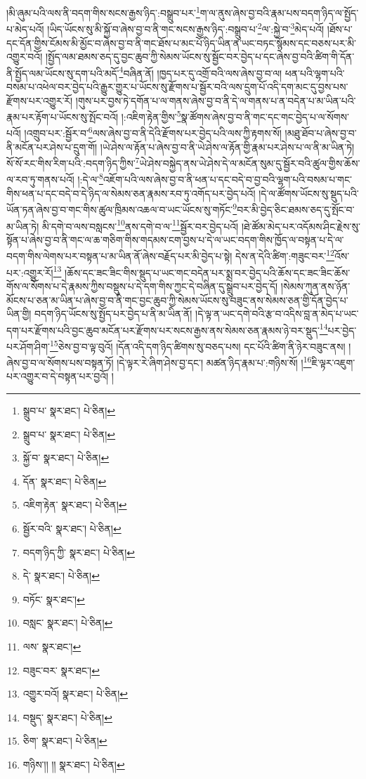 །མི་ཞུམ་པའི་ལས་ནི་བདག་གིས་སངས་རྒྱས་ཉིད་:བསྒྲུབ་པར་\footnote{སྒྲུབ་པ་  སྣར་ཐང་།  པེ་ཅིན། }ག་ལ་ནུས་ཞེས་བྱ་བའི་རྣམ་པས་བདག་ཉིད་ལ་སྤྱོད་པ་མེད་པའོ། །ཡིད་ཡོངས་སུ་མི་སྐྱོ་བ་ཞེས་བྱ་བ་ནི་གང་སངས་རྒྱས་ཉིད་:བསྒྲུབ་པ་\footnote{སྒྲུབ་པ་  སྣར་ཐང་།  པེ་ཅིན། }ལ་:སྐྱེ་བ་\footnote{སྐྱོ་བ་  སྣར་ཐང་།  པེ་ཅིན། }མེད་པའོ། །ཐོས་པ་དང་དོན་གྱིས་ངོམས་མི་མྱོང་བ་ཞེས་བྱ་བ་ནི་གང་ཐོས་པ་མང་པོ་ཉིད་ཡིན་ན་ཡང་བཏང་སྙོམས་དང་བཅས་པར་མི་འགྱུར་བའོ། །སྤྱོད་ལམ་ཐམས་ཅད་དུ་བྱང་ཆུབ་ཀྱི་སེམས་ཡོངས་སུ་སྦྱོང་བར་བྱེད་པ་དང་ཞེས་བྱ་བའི་ཚིག་གི་དོན་ནི་སྤྱོད་ལམ་ཡོངས་སུ་དག་པའི་མདོ་\footnote{དོན་  སྣར་ཐང་།  པེ་ཅིན། }བཞིན་ནོ། །ཁྱད་པར་དུ་འགྲོ་བའི་ལས་ཞེས་བྱ་བ་ལ། ཕན་པའི་ལྷག་པའི་བསམ་པ་འཕེལ་བར་བྱེད་པའི་རྒྱུར་གྱུར་པ་ཡོངས་སུ་རྫོགས་པ་སྦྱོར་བའི་ལས་དྲུག་པོ་འདི་དག་མང་དུ་བྱས་པས་རྫོགས་པར་འགྱུར་རོ། །གུས་པར་བྱས་ཏེ་དགོན་པ་ལ་གནས་ཞེས་བྱ་བ་ནི་དེ་ལ་གནས་པ་ན་བདེན་པ་མ་ཡིན་པའི་རྣམ་པར་རྟོག་པ་ཡོངས་སུ་སྤོང་བའོ། །:འཇིག་རྟེན་གྱིས་\footnote{འཇིག་རྟེན་  སྣར་ཐང་།  པེ་ཅིན། }སྣ་ཚོགས་ཞེས་བྱ་བ་ནི་གང་དང་གང་བྱེད་པ་ལ་སོགས་པའོ། །འགྲུབ་པར་:སྦྱོར་བ་\footnote{སྦྱོར་བའི་  སྣར་ཐང་།  པེ་ཅིན། }ལས་ཞེས་བྱ་བ་ནི་དེའི་རྫོགས་པར་བྱེད་པའི་ལས་ཀྱི་རྟགས་སོ། །མཐུ་ཐོབ་པ་ཞེས་བྱ་བ་ནི་མངོན་པར་ཤེས་པ་དྲུག་གོ། །ཡེ་ཤེས་ལ་རྟོན་པ་ཞེས་བྱ་བ་ནི་ཡེ་ཤེས་ལ་རྟོན་གྱི་རྣམ་པར་ཤེས་པ་ལ་ནི་མ་ཡིན་ཏེ། སོ་སོ་རང་གིས་རིག་པའི་:བདག་ཉིད་ཀྱིས་\footnote{བདག་ཉིད་ཀྱི་  སྣར་ཐང་།  པེ་ཅིན། }ཡེ་ཤེས་བསྐྱེད་ནས་ཡེ་ཤེས་དེ་ལ་མངོན་སུམ་དུ་སྦྱོར་བའི་ཚུལ་གྱིས་ཆོས་ལ་རབ་ཏུ་གནས་པའོ། །:དེ་ལ་\footnote{དེ་  སྣར་ཐང་།  པེ་ཅིན། }འཇོག་པའི་ལས་ཞེས་བྱ་བ་ནི་ཕན་པ་དང་བདེ་བ་བྱ་བའི་ལྷག་པའི་བསམ་པ་གང་གིས་ཕན་པ་དང་བདེ་བ་དེ་ཉིད་ལ་སེམས་ཅན་རྣམས་རབ་ཏུ་འགོད་པར་བྱེད་པའོ། །དེ་ལ་ཚོགས་ཡོངས་སུ་སྡུད་པའི་ཡོན་ཏན་ཞེས་བྱ་བ་གང་གིས་ཚུལ་ཁྲིམས་འཆལ་བ་ཡང་ཡོངས་སུ་གཏོང་\footnote{བཏོང་  སྣར་ཐང་། }བར་མི་བྱེད་ཅིང་ཐམས་ཅད་དུ་སྤོང་བ་མ་ཡིན་ཏེ། མི་དགེ་བ་ལས་བསླངས་\footnote{བསླང་  སྣར་ཐང་།  པེ་ཅིན། }ནས་དགེ་བ་ལ་\footnote{ལས་  སྣར་ཐང་། }སྦྱོར་བར་བྱེད་པའོ། །ཐེ་ཚོམ་མེད་པར་འདོམས་ཤིང་རྗེས་སུ་སྟོན་པ་ཞེས་བྱ་བ་ནི་གང་ལ་ཆ་གཅིག་གིས་གདམས་ངག་བྱས་པ་དེ་ལ་ཡང་བདག་གིས་ཁྱོད་ལ་བསྟན་པ་དེ་ལ་བདག་གིས་ལེགས་པར་བསྟན་པ་མ་ཡིན་ནོ་ཞེས་བརྗོད་པར་མི་བྱེད་པ་སྟེ། དེས་ན་དེའི་ཚིག་:གཟུང་བར་\footnote{བཟུང་བར་  སྣར་ཐང་། }འོས་པར་:འགྱུར་རོ།\footnote{འགྱུར་བའོ།  སྣར་ཐང་།  པེ་ཅིན། } །ཆོས་དང་ཟང་ཟིང་གིས་སྡུད་པ་ཡང་གང་བདེན་པར་སྨྲ་བར་བྱེད་པའི་ཆོས་དང་ཟང་ཟིང་ཆོས་གོས་ལ་སོགས་པ་དེ་རྣམས་ཀྱིས་བསྡུས་པ་དེ་དག་གིས་ཀྱང་དེ་བཞིན་དུ་སྒྲུབ་པར་བྱེད་དོ། །སེམས་ཀུན་ནས་ཉོན་མོངས་པ་ཅན་མ་ཡིན་པ་ཞེས་བྱ་བ་ནི་གང་བྱང་ཆུབ་ཀྱི་སེམས་ཡོངས་སུ་བཟུང་ནས་སེམས་ཅན་གྱི་དོན་བྱེད་པ་ཡིན་གྱི། བདག་ཉིད་ཡོངས་སུ་སྤྱོད་པར་བྱེད་པ་ནི་མ་ཡིན་ནོ། །དེ་ལྟ་ན་ཡང་དགེ་བའི་རྩ་བ་འདིས་བླ་ན་མེད་པ་ཡང་དག་པར་རྫོགས་པའི་བྱང་ཆུབ་མངོན་པར་རྫོགས་པར་སངས་རྒྱས་ནས་སེམས་ཅན་རྣམས་ཉེ་བར་སྡུད་\footnote{བསྡུད་  སྣར་ཐང་།  པེ་ཅིན། }པར་བྱེད་པར་ཤོག་ཤིག་\footnote{ཅིག་  སྣར་ཐང་།  པེ་ཅིན། }ཅེས་བྱ་བ་ལྟ་བུའོ། །དོན་འདི་དག་ཉིད་ཚིགས་སུ་བཅད་པས། དང་པོའི་ཚིག་ནི་ཉེར་བཟུང་ནས། །ཞེས་བྱ་བ་ལ་སོགས་པས་བསྟན་ཏོ། །དེ་ལྟར་རེ་ཞིག་ཤེས་བྱ་དང་། མཚན་ཉིད་རྣམ་པ་:གཉིས་སོ། །\footnote{གཉིས་།། །།  སྣར་ཐང་།  པེ་ཅིན། }ཇི་ལྟར་འཇུག་པར་འགྱུར་བ་དེ་བསྟན་པར་བྱའོ། །
